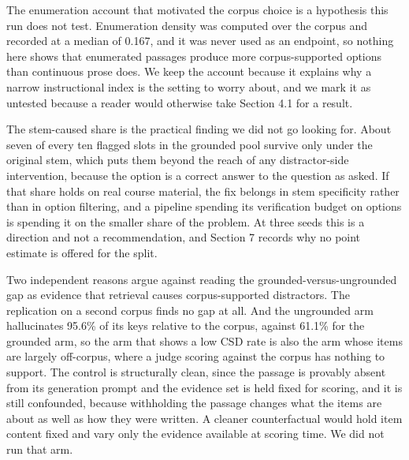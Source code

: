 \documentclass[11pt]{article}
\begin{document}
The enumeration account that motivated the corpus choice is a hypothesis this run does not test. Enumeration density was computed over the corpus and recorded at a median of 0.167, and it was never used as an endpoint, so nothing here shows that enumerated passages produce more corpus-supported options than continuous prose does. We keep the account because it explains why a narrow instructional index is the setting to worry about, and we mark it as untested because a reader would otherwise take Section 4.1 for a result.

The stem-caused share is the practical finding we did not go looking for. About seven of every ten flagged slots in the grounded pool survive only under the original stem, which puts them beyond the reach of any distractor-side intervention, because the option is a correct answer to the question as asked. If that share holds on real course material, the fix belongs in stem specificity rather than in option filtering, and a pipeline spending its verification budget on options is spending it on the smaller share of the problem. At three seeds this is a direction and not a recommendation, and Section 7 records why no point estimate is offered for the split.

Two independent reasons argue against reading the grounded-versus-ungrounded gap as evidence that retrieval causes corpus-supported distractors. The replication on a second corpus finds no gap at all. And the ungrounded arm hallucinates 95.6\% of its keys relative to the corpus, against 61.1\% for the grounded arm, so the arm that shows a low CSD rate is also the arm whose items are largely off-corpus, where a judge scoring against the corpus has nothing to support. The control is structurally clean, since the passage is provably absent from its generation prompt and the evidence set is held fixed for scoring, and it is still confounded, because withholding the passage changes what the items are about as well as how they were written. A cleaner counterfactual would hold item content fixed and vary only the evidence available at scoring time. We did not run that arm.
\end{document}
